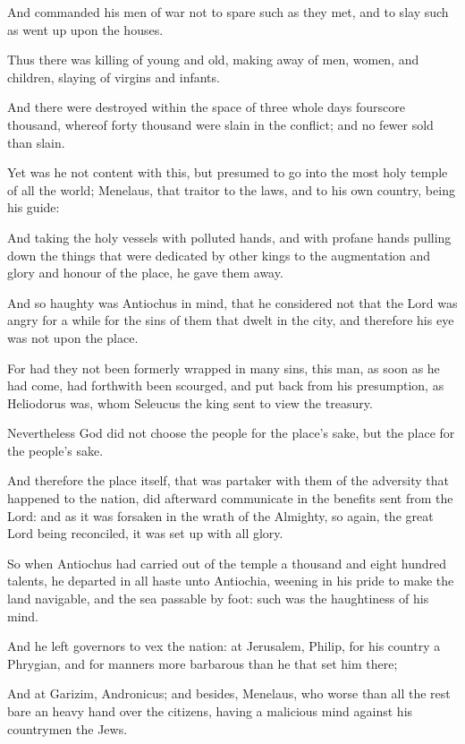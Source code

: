 {\par }{\PP {}And commanded his men of war not to spare such as they met, and to slay such as went up upon the houses.
\par }{\PP {}Thus there was killing of young and old, making away of men, women, and children, slaying of virgins and infants.
\par }{\PP {}And there were destroyed within the space of three whole days fourscore thousand, whereof forty thousand were slain in the conflict; and no fewer sold than slain.
\par }{\PP {}Yet was he not content with this, but presumed to go into the most holy temple of all the world; Menelaus, that traitor to the laws, and to his own country, being his guide:
\par }{\PP {}And taking the holy vessels with polluted hands, and with profane hands pulling down the things that were dedicated by other kings to the augmentation and glory and honour of the place, he gave them away.
\par }{\PP {}And so haughty was Antiochus in mind, that he considered not that the Lord was angry for a while for the sins of them that dwelt in the city, and therefore his eye was not upon the place.
\par }{\PP {}For had they not been formerly wrapped in many sins, this man, as soon as he had come, had forthwith been scourged, and put back from his presumption, as Heliodorus was, whom Seleucus the king sent to view the treasury.
\par }{\PP {}Nevertheless God did not choose the people for the place’s sake, but the place for the people’s sake.
\par }{\PP {}And therefore the place itself, that was partaker with them of the adversity that happened to the nation, did afterward communicate in the benefits sent from the Lord: and as it was forsaken in the wrath of the Almighty, so again, the great Lord being reconciled, it was set up with all glory.
\par }{\PP {}So when Antiochus had carried out of the temple a thousand and eight hundred talents, he departed in all haste unto Antiochia, weening in his pride to make the land navigable, and the sea passable by foot: such was the haughtiness of his mind.
\par }{\PP {}And he left governors to vex the nation: at Jerusalem, Philip, for his country a Phrygian, and for manners more barbarous than he that set him there;
\par }{\PP {}And at Garizim, Andronicus; and besides, Menelaus, who worse than all the rest bare an heavy hand over the citizens, having a malicious mind against his countrymen the Jews.
}
